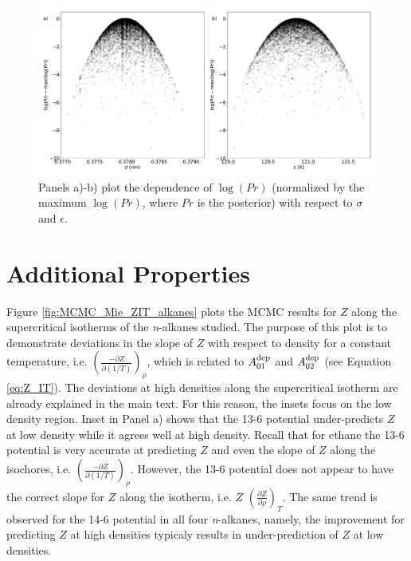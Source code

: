 \documentclass[journal=jctc,manuscript=article]{achemso}
\begin{document}
\begin{figure}[p!]
	\centering
	\includegraphics[width=6.4in]{MCMC_supporting_information_2}
	\caption{Panels a)-b) plot the dependence of $\log(Pr)$ (normalized by the maximum $\log(Pr)$, where $Pr$ is the posterior) with respect to $\sigma$ and $\epsilon$.}
	\label{fig:MCMC_supporting_information_2}
\end{figure} 

\newpage

\section{Additional Properties} \label{Udep and Z_IT}

Figure \ref{fig:MCMC_Mie_ZIT_alkanes} plots the MCMC results for $Z$ along the supercritical isotherms of the \textit{n}-alkanes studied. The purpose of this plot is to demonstrate deviations in the slope of $Z$ with respect to density for a constant temperature, i.e. $\left(\frac{-\partial Z}{\partial(1/T)}\right)_\rho$, which is related to $A_{01}^{\rm dep}$ and $A_{02}^{\rm dep}$ (see Equation \ref{eq:Z_IT}). The deviations at high densities along the supercritical isotherm are already explained in the main text. For this reason, the insets focus on the low density region. Inset in Panel a) shows that the 13-6 potential under-predicts $Z$ at low density while it agrees well at high density. Recall that for ethane the 13-6 potential is very accurate at predicting $Z$ and even the slope of $Z$ along the isochores, i.e. $\left(\frac{-\partial Z}{\partial(1/T)}\right)_\rho$. However, the 13-6 potential does not appear to have the correct slope for $Z$ along the isotherm, i.e. $Z$ $\left(\frac{\partial Z}{\partial \rho}\right)_T$. The same trend is observed for the 14-6 potential in all four \textit{n}-alkanes, namely, the improvement for predicting $Z$ at high densities typicaly results in under-prediction of $Z$ at low densities.
\end{document}
